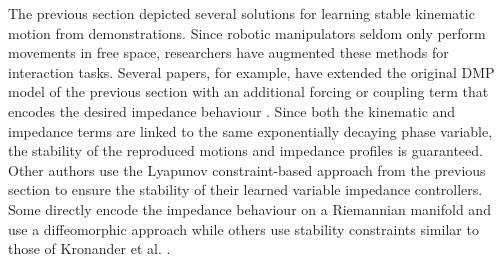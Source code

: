 

The previous section depicted several solutions for learning stable kinematic motion from demonstrations. Since robotic manipulators seldom only perform movements in free space, researchers have augmented these methods for interaction tasks. Several papers, for example, have extended the original DMP model of the previous section with an additional forcing or coupling term that encodes the desired impedance behaviour \cite{saverianoDynamicMovementPrimitives2021,dongDMPbasedOnlineAdaptive2021,hanModifiedDynamicMovement2022,hanModifiedDynamicMovement2022,liaoDynamicSkillLearning2022,yangDMPsbasedFrameworkRobot2018,yuHumanRobotVariableImpedance2022,zengRobotLearningHuman2018,zhangLearningGeneralizingVariable2022}. Since both the kinematic and impedance terms are linked to the same exponentially decaying phase variable, the stability of the reproduced motions and impedance profiles is guaranteed. Other authors use the Lyapunov constraint-based approach from the previous section to ensure the stability of their learned variable impedance controllers. Some directly encode the impedance behaviour on a Riemannian manifold and use a diffeomorphic approach \cite{saverianoLearningStableRobotic2022,wangLearningDeepRobotic2022} while others use
stability constraints similar to those of Kronander et al. \cite{kronanderStabilityConsiderationsVariable2016} \cite{jinOptimalVariableImpedance2022,douRobotSkillLearning2022,duanSequentialLearningUnification2019,arduengoGaussianProcessbasedRobotLearning2020}. 

